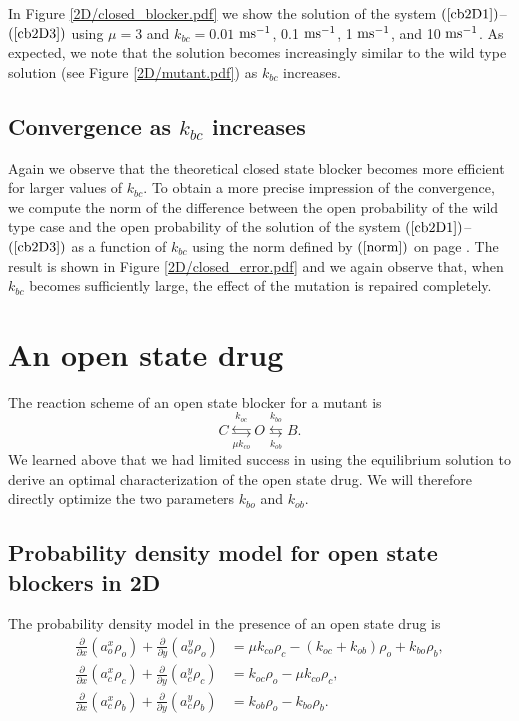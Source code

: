 In Figure \ref{2D/closed_blocker.pdf} we show 
the solution of the system $(\ref{cb2D1})$--$(\ref{cb2D3})$ using $\mu=3$ and
$k_{bc}=0.01$ $\rm{ms^{-1}}$, 0.1 $\rm{ms^{-1}}$, 1 $\rm{ms^{-1}}$, and 10 $\rm{ms^{-1}}$. As expected, we note that the solution becomes increasingly similar to the wild type solution
(see Figure \ref{2D/mutant.pdf}) as $k_{bc}$ increases. 

\subsection{Convergence as $k_{bc}$ increases}
 Again we observe that the theoretical closed state blocker becomes more
efficient for larger values of $k_{bc}.$ To obtain a more precise impression of the convergence,
 we compute the norm of the difference between the open probability
of the wild type case and the open probability of the solution of the system
$(\ref{cb2D1})$--$(\ref{cb2D3})$ as a function of $k_{bc}$ using the norm defined by $(\ref{norm})$ on page \pageref{norm}. 
The result is shown in Figure \ref{2D/closed_error.pdf} and we again observe that, when $k_{bc}$ becomes sufficiently large, the effect of the mutation is repaired completely.


\section{An open state drug}

The reaction scheme of an open state blocker for a mutant is%
\[
C\underset{\mu k_{co}}{\overset{k_{oc}}{\leftrightarrows}}O\underset{k_{ob}%
}{\overset{k_{bo}}{\leftrightarrows}}B.
\]
We learned above that we had limited success in using the equilibrium solution
to derive an optimal characterization of the open state drug. We will
therefore directly optimize the two parameters $k_{bo}$ and $k_{ob}.$

\subsection{Probability density model for open state blockers in 2D}

The probability density model in the presence of an open state drug is
\begin{align}
\frac{\partial}{\partial x}\left(  a_{o}^{x}\rho_{o}\right)  +\frac{\partial
}{\partial y}\left(  a_{o}^{y}\rho_{o}\right)   &  =\mu k_{co}\rho_{c}%
-(k_{oc}+k_{ob})\rho_{o} + k_{bo}\rho_{b},\label{ob2D1}\\
\frac{\partial}{\partial x}\left(  a_{c}^{x}\rho_{c}\right)  +\frac{\partial
}{\partial y}\left(  a_{c}^{y}\rho_{c}\right)   &  =k_{oc}\rho_{o}-\mu
k_{co}\rho_{c},\label{ob2D2}\\
\frac{\partial}{\partial x}\left(  a_{c}^{x}\rho_{b}\right)  +\frac{\partial
}{\partial y}\left(  a_{c}^{y}\rho_{b}\right)   &  =k_{ob}\rho_{o}-k_{bo}%
\rho_{b}.\label{ob2D3}%
\end{align}

